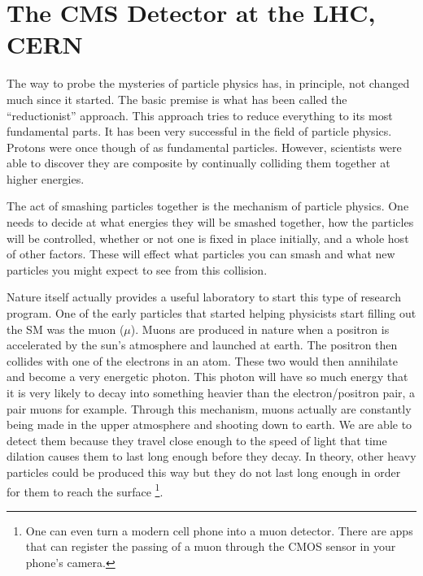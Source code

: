 \chapter{The CMS Detector at the LHC, CERN}
\label{chap:three}

The way to probe the mysteries of particle physics has, in principle, not changed much since it started.
The basic premise is what has been called the ``reductionist'' approach. 
This approach tries to reduce everything to its most fundamental parts.
It has been very successful in the field of particle physics. 
Protons were once though of as fundamental particles. However, scientists were able to discover they are composite by continually colliding them together at higher energies.

The act of smashing particles together is the mechanism of particle physics. 
One needs to decide at what energies they will be smashed together, how the particles will be controlled, whether or not one is fixed in place initially, and a whole host of other factors.
These will effect what particles you can smash and what new particles you might expect to see from this collision.

Nature itself actually provides a useful laboratory to start this type of research program.
One of the early particles that started helping physicists start filling out the SM was the muon ($\mu$).
Muons are produced in nature when a positron is accelerated by the sun's atmosphere and launched at earth.
The positron then collides with one of the electrons in an atom. These two would then annihilate and become a very energetic photon.
This photon will have so much energy that it is very likely to decay into something heavier than the electron/positron pair, a pair muons for example.
Through this mechanism, muons actually are constantly being made in the upper atmosphere and shooting down to earth. 
We are able to detect them because they travel close enough to the speed of light that time dilation causes them to last long enough before they decay.
In theory, other heavy particles could be produced this way but they do not last long enough in order for them to reach the surface \footnote{One can even turn a modern cell phone into a muon detector. There are apps that can register the passing of a muon through the CMOS sensor in your phone's camera.}.


